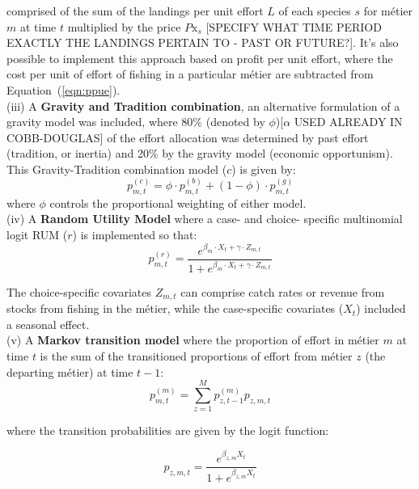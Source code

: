 \documentclass[12pt, halfline, a4paper]{ouparticle}
\begin{document}
comprised of the sum of the landings per unit effort $L$ of each species $s$ for métier $m$ at
time $t$ multiplied by the price $P\text{x}_{s}$ [SPECIFY WHAT TIME PERIOD EXACTLY THE LANDINGS PERTAIN TO - PAST OR FUTURE?]. It's also possible to
implement this approach based on profit per unit effort, where the cost per
unit of effort of fishing in a particular métier are subtracted from Equation~(\ref{eqn:ppue}). \\

(iii) A \textbf{Gravity and Tradition combination}, an alternative formulation
of a gravity model was included, where 80\% (denoted by $\phi$)[$\alpha$ USED ALREADY IN COBB-DOUGLAS] of the effort
allocation was determined by past effort (tradition, or inertia) and 20\% by
the gravity model (economic opportunism). This Gravity-Tradition combination
model ($c$) is given by:
\begin{equation}
	p^{(c)}_{m,t} = \phi \cdot p^{(b)}_{m,t} + (1 - \phi) \cdot p^{(g)}_{m,t}
\end{equation}
where $\phi$ controls the proportional weighting of either model. \\ 

(iv) A \textbf{Random Utility Model} where a case- and choice- specific
multinomial logit RUM ($r$) is implemented so that:  
\begin{equation}
p^{(r)}_{m,t} = \frac{e^{\beta_{m} \cdot X_{t} + \gamma \cdot Z_{m,t}}}{1 + 
	e^{\beta_{m} \cdot X_{t} + \gamma \cdot Z_{m,t}}}
\label{eqn:rum}
\end{equation} 

The choice-specific covariates $Z_{m,t}$ can comprise catch rates or revenue
from stocks from fishing in the métier, while the case-specific covariates
($X_{t}$) included a seasonal effect. \\

(v) A \textbf{Markov transition model} where the proportion of effort in métier
$m$ at time $t$ is the sum of the transitioned proportions of effort from
métier $z$ (the departing métier) at time $t-1$:
\begin{equation}
p^{(m)}_{m,t} = \sum_{z = 1}^{M} p^{(m)}_{z, t-1} p_{z,m,t}
\end{equation}

where the transition probabilities are given by the logit function:

\begin{equation}
p_{z,m,t} = \frac{e^{\beta_{z,m} X_{t}}}{1+e^{\beta_{z,m} X_{t}}}
\end{equation}
\end{document}
